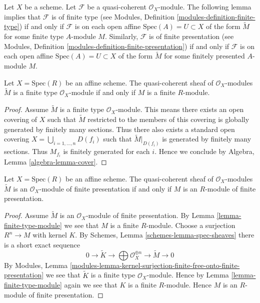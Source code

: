 \noindent
Let $X$ be a scheme.
Let $\mathcal{F}$ be a quasi-coherent $\mathcal{O}_X$-module.
The following lemma implies that $\mathcal{F}$ is of finite type
(see Modules, Definition \ref{modules-definition-finite-type})
if and only if $\mathcal{F}$ is
on each open affine $\text{Spec}(A) = U \subset X$
of the form $\widetilde M$ for some finite type $A$-module $M$.
Similarly, $\mathcal{F}$ is of finite presentation
(see Modules, Definition \ref{modules-definition-finite-presentation})
if and only if $\mathcal{F}$ is
on each open affine $\text{Spec}(A) = U \subset X$
of the form $\widetilde M$ for some finitely presented $A$-module $M$.

\begin{lemma}
\label{lemma-finite-type-module}
Let $X = \text{Spec}(R)$ be an affine scheme.
The quasi-coherent sheaf of $\mathcal{O}_X$-modules
$\widetilde M$ is a finite type $\mathcal{O}_X$-module
if and only if $M$ is a finite $R$-module.
\end{lemma}

\begin{proof}
Assume $\widetilde M$ is a finite type $\mathcal{O}_X$-module.
This means there exists an open covering of $X$ such that
$\widetilde M$ restricted to the members of this covering is
globally generated by finitely many sections.
Thus there also exists a standard open covering
$X = \bigcup_{i = 1, \ldots, n} D(f_i)$ such that $\widetilde M|_{D(f_i)}$
is generated by finitely many sections. Thus $M_{f_i}$ is finitely
generated for each $i$. Hence we conclude by
Algebra, Lemma \ref{algebra-lemma-cover}.
\end{proof}

\begin{lemma}
\label{lemma-finite-presentation-module}
Let $X = \text{Spec}(R)$ be an affine scheme. The quasi-coherent sheaf
of $\mathcal{O}_X$-modules $\widetilde M$ is an $\mathcal{O}_X$-module of
finite presentation if and only if $M$ is an $R$-module of finite presentation.
\end{lemma}

\begin{proof}
Assume $\widetilde M$ is an $\mathcal{O}_X$-module of finite presentation.
By Lemma \ref{lemma-finite-type-module} we see that $M$ is a finite $R$-module.
Choose a surjection $R^n \to M$ with kernel $K$. By
Schemes, Lemma \ref{schemes-lemma-spec-sheaves}
there is a short exact sequence
$$
0 \to \widetilde{K} \to
\bigoplus \mathcal{O}_X^{\oplus n} \to
\widetilde{M} \to 0
$$
By
Modules, Lemma
\ref{modules-lemma-kernel-surjection-finite-free-onto-finite-presentation}
we see that $\widetilde{K}$ is a finite type $\mathcal{O}_X$-module.
Hence by Lemma \ref{lemma-finite-type-module}
again we see that $K$ is a finite $R$-module.
Hence $M$ is an $R$-module of finite presentation.
\end{proof}













